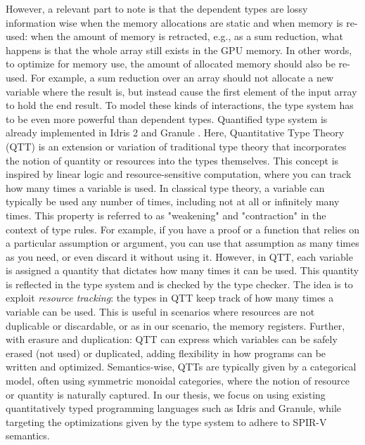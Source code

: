 \documentclass[10pt,a4paper]{article}
\begin{document}
However, a relevant part to note is that the dependent types are lossy information wise when the memory allocations are static and when memory is re-used: when the amount of memory is retracted, e.g., as a sum reduction, what happens is that the whole array still exists in the GPU memory.
In other words, to optimize for memory use, the amount of allocated memory should also be re-used.
For example, a sum reduction over an array should not allocate a new variable where the result is, but instead cause the first element of the input array to hold the end result.
To model these kinds of interactions, the type system has to be even more powerful than dependent types.
Quantified type system is already implemented in Idris 2 \cite{Idris2QuantiBrady2021} and Granule \cite{QuantitativePrOrchar2019}.
Here, Quantitative Type Theory (QTT) is an extension or variation of traditional type theory that incorporates the notion of quantity or resources into the types themselves.
This concept is inspired by linear logic and resource-sensitive computation, where you can track how many times a variable is used.
In classical type theory, a variable can typically be used any number of times, including not at all or infinitely many times.
This property is referred to as "weakening" and "contraction" in the context of type rules. For example, if you have a proof or a function that relies on a particular assumption or argument, you can use that assumption as many times as you need, or even discard it without using it.
However, in QTT, each variable is assigned a quantity that dictates how many times it can be used. This quantity is reflected in the type system and is checked by the type checker.
The idea is to exploit \emph{resource tracking}: the types in QTT keep track of how many times a variable can be used.
This is useful in scenarios where resources are not duplicable or discardable, or as in our scenario, the memory registers.
Further, with erasure and duplication: QTT can express which variables can be safely erased (not used) or duplicated, adding flexibility in how programs can be written and optimized.
Semantics-wise, QTTs are typically given by a categorical model, often using symmetric monoidal categories, where the notion of resource or quantity is naturally captured.
In our thesis, we focus on using existing quantitatively typed programming languages such as Idris and Granule, while targeting the optimizations given by the type system to adhere to SPIR-V semantics.
\end{document}
